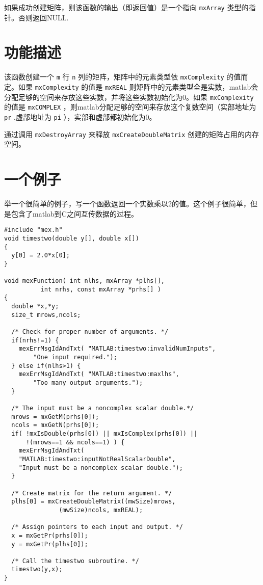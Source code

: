 \documentclass[10pt,a4paper,UTF8]{article}
\begin{document}
如果成功创建矩阵，则该函数的输出（即返回值）是一个指向 \texttt{mxArray} 类型的指针。否则返回NULL.
\section{功能描述}
\label{sec:orgheadline4}


该函数创建一个 \texttt{m} 行 \texttt{n} 列的矩阵，矩阵中的元素类型依 \texttt{mxComplexity} 的值而定。如果 \texttt{mxComplexity} 的值是 \texttt{mxREAL} 则矩阵中的元素类型全是实数，matlab会分配足够的空间来存放这些实数，并将这些实数初始化为0。如果 \texttt{mxComplexity} 的值是 \texttt{mxCOMPLEX} ，则matlab分配足够的空间来存放这个复数空间（实部地址为 \texttt{pr} ,虚部地址为 \texttt{pi} ），实部和虚部都初始化为0。

通过调用 \texttt{mxDestroyArray} 来释放 \texttt{mxCreateDoubleMatrix} 创建的矩阵占用的内存空间。

\section{一个例子}
\label{sec:orgheadline5}


举一个很简单的例子，写一个函数返回一个实数乘以2的值。这个例子很简单，但是包含了matlab到C之间互传数据的过程。
\lstset{language=C,label= ,caption= ,captionpos=b,numbers=left}
\begin{lstlisting}
#include "mex.h"
void timestwo(double y[], double x[])
{
  y[0] = 2.0*x[0];
}

void mexFunction( int nlhs, mxArray *plhs[],
		  int nrhs, const mxArray *prhs[] )
{
  double *x,*y;
  size_t mrows,ncols;

  /* Check for proper number of arguments. */
  if(nrhs!=1) {
    mexErrMsgIdAndTxt( "MATLAB:timestwo:invalidNumInputs",
	    "One input required.");
  } else if(nlhs>1) {
    mexErrMsgIdAndTxt( "MATLAB:timestwo:maxlhs",
	    "Too many output arguments.");
  }

  /* The input must be a noncomplex scalar double.*/
  mrows = mxGetM(prhs[0]);
  ncols = mxGetN(prhs[0]);
  if( !mxIsDouble(prhs[0]) || mxIsComplex(prhs[0]) ||
      !(mrows==1 && ncols==1) ) {
    mexErrMsgIdAndTxt(
    "MATLAB:timestwo:inputNotRealScalarDouble",
    "Input must be a noncomplex scalar double.");
  }

  /* Create matrix for the return argument. */
  plhs[0] = mxCreateDoubleMatrix((mwSize)mrows,
			   (mwSize)ncols, mxREAL);

  /* Assign pointers to each input and output. */
  x = mxGetPr(prhs[0]);
  y = mxGetPr(plhs[0]);

  /* Call the timestwo subroutine. */
  timestwo(y,x);
}
\end{lstlisting}
\end{document}
